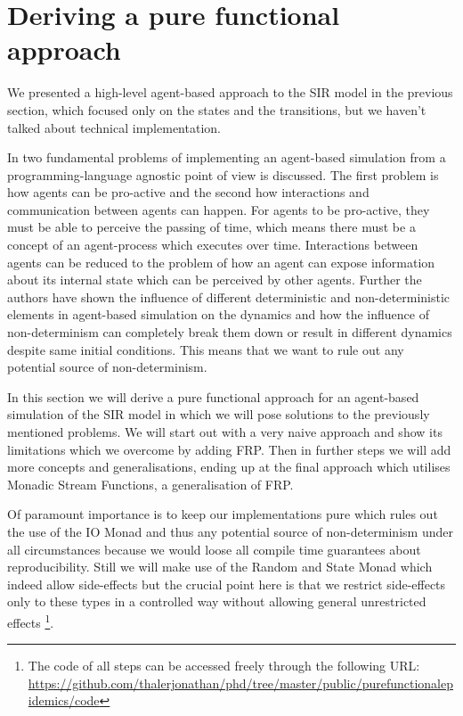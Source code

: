 \section{Deriving a pure functional approach}
\label{sec:functional_approach}

We presented a high-level agent-based approach to the SIR model in the previous section, which focused only on the states and the transitions, but we haven't talked about technical implementation. 

In \cite{thaler_art_2017} two fundamental problems of implementing an agent-based simulation from a programming-language agnostic point of view is discussed. The first problem is how agents can be pro-active and the second how interactions and communication between agents can happen. For agents to be pro-active, they must be able to perceive the passing of time, which means there must be a concept of an agent-process which executes over time. Interactions between agents can be reduced to the problem of how an agent can expose information about its internal state which can be perceived by other agents. Further the authors have shown the influence of different deterministic and non-deterministic elements in agent-based simulation on the dynamics and how the influence of non-determinism can completely break them down or result in different dynamics despite same initial conditions. This means that we want to rule out any potential source of non-determinism.

In this section we will derive a pure functional approach for an agent-based simulation of the SIR model in which we will pose solutions to the previously mentioned problems. We will start out with a very naive approach and show its limitations which we overcome by adding FRP. Then in further steps we will add more concepts and generalisations, ending up at the final approach which utilises Monadic Stream Functions, a generalisation of FRP. 

Of paramount importance is to keep our implementations pure which rules out the use of the IO Monad and thus any potential source of non-determinism under all circumstances because we would loose all compile time guarantees about reproducibility. Still we will make use of the Random and State Monad which indeed allow side-effects but the crucial point here is that we restrict side-effects only to these types in a controlled way without allowing general unrestricted effects
\footnote{The code of all steps can be accessed freely through the following URL: \url{https://github.com/thalerjonathan/phd/tree/master/public/purefunctionalepidemics/code}}.


